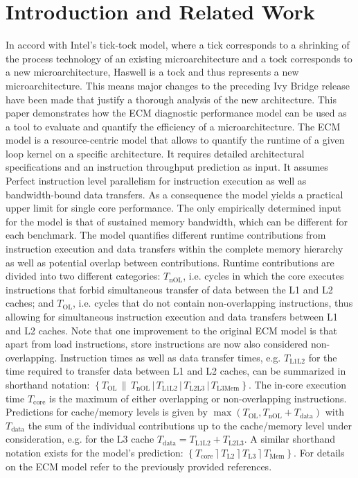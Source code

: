 \documentclass{llncs}
\newcommand{\epsep}{\rceil}
\newcommand{\olsep}{\|}
\newcommand{\nolsep}{|}
\newcommand{\ecmspace}{\,}
\newcommand{\ecmshort}[5]{\mbox{$\left\{{#1}\ecmspace\olsep\ecmspace {#2}\ecmspace\nolsep\ecmspace {#3}\ecmspace\nolsep\ecmspace {#4}\ecmspace\nolsep\ecmspace {#5}\right\}$}}
\newcommand{\ecmpshort}[4]{\mbox{$\left\{{#1}\ecmspace\epsep\ecmspace {#2}\ecmspace\epsep\ecmspace {#3}\ecmspace\epsep\ecmspace {#4}\right\}$}}
\begin{document}
\section{Introduction and Related Work}
In accord with Intel's tick-tock model, where a tick corresponds to a shrinking
of the process technology of an existing microarchitecture and a tock
corresponds to a new microarchitecture, Haswell is a tock and thus represents a
new microarchitecture. This means major changes to the preceding Ivy Bridge
release have been made that justify a thorough analysis of the new
architecture. This paper demonstrates how the \ac{ECM} diagnostic performance
model \cite{Hofmann:2015:1,Treibig:2009,hager:cpe,sthw15} can be used as a tool
to evaluate and quantify the efficiency of a microarchitecture.
The ECM model is a resource-centric model that allows to quantify the runtime
of a given loop kernel on a specific architecture. It requires detailed
architectural specifications and an instruction throughput prediction as input.
It assumes Perfect instruction level parallelism for instruction execution as
well as bandwidth-bound data transfers. As a consequence the model yields a
practical upper limit for single core performance. The only empirically
determined input for the model is that of sustained memory bandwidth, which can
be different for each benchmark.  The model quantifies different runtime
contributions from instruction execution and data transfers within the complete
memory hierarchy as well as potential overlap between contributions. Runtime
contributions are divided into two different categories: $T_\mathrm{nOL}$, i.e.
cycles in which the core executes instructions that forbid simultaneous
transfer of data between the L1 and L2 caches; and $T_\mathrm{OL}$, i.e. cycles
that do not contain non-overlapping instructions, thus allowing for
simultaneous instruction execution and data transfers between L1 and L2 caches.
Note that one improvement to the original \ac{ECM} model is that apart from
load instructions, store instructions are now also considered non-overlapping.
Instruction times as well as data transfer times, e.g. $T_\mathrm{L1L2}$
for the time required to transfer data between L1 and L2 caches, can be
summarized in shorthand notation:
\ecmshort{T_\mathrm{OL}}{T_\mathrm{nOL}}{T_\mathrm{L1L2}}{T_\mathrm{L2L3}}{T_\mathrm{L3Mem}}.
The in-core execution time $T_\mathrm{core}$ is the maximum of either
overlapping or non-overlapping instructions. Predictions for cache/memory
levels is given by $\max(T_\mathrm{OL}, T_\mathrm{nOL}+T_\mathrm{data})$ with
$T_\mathrm{data}$ the sum of the individual contributions up to the
cache/memory level under consideration, e.g. for the L3 cache
$T_\mathrm{data}=T_\mathrm{L1L2}+T_\mathrm{L2L3}$. A similar shorthand notation
exists for the model's prediction:
\ecmpshort{T_\mathrm{core}}{T_\mathrm{L2}}{T_\mathrm{L3}}{T_\mathrm{Mem}}{}.
For details on the ECM model refer to the previously provided references.
\end{document}
